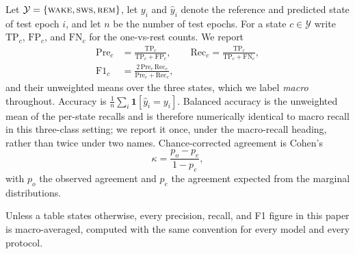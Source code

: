 Let $\mathcal{Y} = \{\textsc{wake}, \textsc{sws}, \textsc{rem}\}$, let
$y_i$ and $\hat{y}_i$ denote the reference and predicted state of test
epoch $i$, and let $n$ be the number of test epochs. For a state
$c \in \mathcal{Y}$ write $\mathrm{TP}_c$, $\mathrm{FP}_c$, and
$\mathrm{FN}_c$ for the one-vs-rest counts. We report
\begin{align}
\mathrm{Pre}_c &= \frac{\mathrm{TP}_c}{\mathrm{TP}_c + \mathrm{FP}_c},
\qquad
\mathrm{Rec}_c = \frac{\mathrm{TP}_c}{\mathrm{TP}_c + \mathrm{FN}_c},
\label{eq:prerec}\\
\mathrm{F1}_c &= \frac{2\,\mathrm{Pre}_c\,\mathrm{Rec}_c}
                      {\mathrm{Pre}_c + \mathrm{Rec}_c},
\label{eq:f1}
\end{align}
and their unweighted means over the three states, which we label
\emph{macro} throughout. Accuracy is
$\frac{1}{n}\sum_i \mathbf{1}[\hat{y}_i = y_i]$. Balanced accuracy is the
unweighted mean of the per-state recalls and is therefore numerically
identical to macro recall in this three-class setting; we report it once,
under the macro-recall heading, rather than twice under two names.
Chance-corrected agreement is Cohen's
\begin{equation}
\kappa = \frac{p_o - p_e}{1 - p_e},
\label{eq:kappa}
\end{equation}
with $p_o$ the observed agreement and $p_e$ the agreement expected from
the marginal distributions.

Unless a table states otherwise, every precision, recall, and F1 figure
in this paper is macro-averaged, computed with the same convention for
every model and every protocol.

